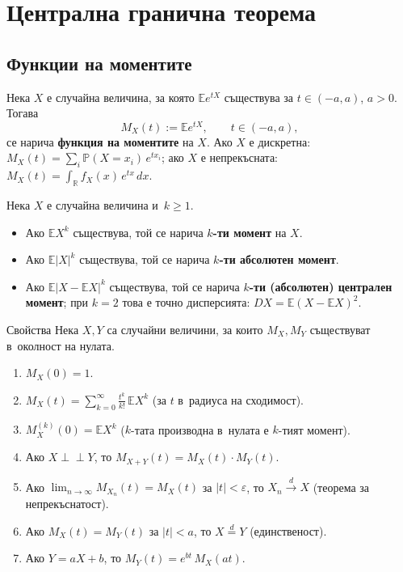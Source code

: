\chapter{Централна гранична теорема}

\section{Функции на моментите}

\begin{defbox}
Нека $X$ е случайна величина, за която $\mathbb Ee^{tX}$ съществува
за $t\in(-a,a)$, $a>0$. Тогава
\[
  M_X(t) := \mathbb Ee^{tX}, \qquad t\in(-a,a),
\]
се нарича \textbf{функция на моментите} на $X$. Ако $X$ е дискретна:
$M_X(t)=\sum_i \mathbb P(X=x_i)\,e^{tx_i}$; ако $X$ е непрекъсната:
$M_X(t)=\int_{\mathbb R} f_X(x)\,e^{tx}\,dx$.
\end{defbox}

\begin{defbox}
Нека $X$ е случайна величина и~$k\ge1$.
\begin{itemize}[nosep]
  \item Ако $\mathbb EX^k$ съществува, той се нарича \textbf{$k$-ти момент} на $X$.
  \item Ако $\mathbb E|X|^k$ съществува, той се нарича \textbf{$k$-ти абсолютен момент}.
  \item Ако $\mathbb E|X-\mathbb EX|^k$ съществува, той се нарича \textbf{$k$-ти (абсолютен) централен момент}; при $k=2$ това е точно дисперсията: $DX=\mathbb E(X-\mathbb EX)^2$.
\end{itemize}
\end{defbox}

\begin{thmbox}{Свойства}
Нека $X,Y$ са случайни величини, за които $M_X,M_Y$ съществуват в~околност на нулата.
\begin{enumerate}[label=\alph*)]
  \item $M_X(0)=1$.
  \item $M_X(t) = \displaystyle\sum_{k=0}^{\infty}\frac{t^k}{k!}\,\mathbb EX^k$ (за $t$ в~радиуса на сходимост).
  \item $M_X^{(k)}(0) = \mathbb EX^k$ ($k$-тата производна в~нулата е $k$-тият момент).
  \item Ако $X\perp\!\!\!\perp Y$, то $M_{X+Y}(t)=M_X(t)\cdot M_Y(t)$.
  \item Ако $\lim_{n\to\infty}M_{X_n}(t)=M_X(t)$ за $|t|<\varepsilon$, то $X_n\xrightarrow{d}X$ (теорема за непрекъснатост).
  \item Ако $M_X(t)=M_Y(t)$ за $|t|<a$, то $X\stackrel{d}{=}Y$ (единственост).
  \item Ако $Y=aX+b$, то $M_Y(t) = e^{bt}\,M_X(at)$.
\end{enumerate}
\end{thmbox}

